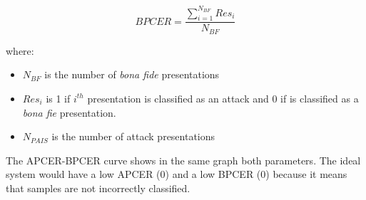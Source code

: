 \begin{equation}
  BPCER = \frac{\sum_{i=1}^{N_{BF}}Res_{i}}{N_{BF}}
\end{equation}

where: \begin{itemize}
\item $N_{BF}$ is the number of \textit{bona fide} presentations
\item $Res_{i}$ is 1 if $i^{th}$ presentation is classified as an attack and 0 if is classified as a \textit{bona fie} presentation.
\item $N_{PAIS}$ is the number of attack presentations
\end{itemize}

The APCER-BPCER curve shows in the same graph both parameters. The ideal system would have a low APCER (0) and a low BPCER (0) because it means that samples are not incorrectly classified.\\ 
